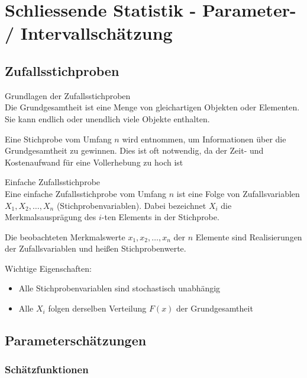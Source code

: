

\section{Schliessende Statistik - Parameter- / Intervallschätzung}

\subsection{Zufallsstichproben}

\begin{concept}{Grundlagen der Zufallsstichproben}\\
Die Grundgesamtheit ist eine Menge von gleichartigen Objekten oder Elementen. Sie kann endlich oder unendlich viele Objekte enthalten.

Eine Stichprobe vom Umfang $n$ wird entnommen, um Informationen über die Grundgesamtheit zu gewinnen. Dies ist oft notwendig, da der Zeit- und Kostenaufwand für eine Vollerhebung zu hoch ist
\end{concept}

\begin{definition}{Einfache Zufallsstichprobe}\\
Eine einfache Zufallsstichprobe vom Umfang $n$ ist eine Folge von Zufallsvariablen $X_1, X_2, \ldots, X_n$ (Stichprobenvariablen). Dabei bezeichnet $X_i$ die Merkmalsausprägung des $i$-ten Elements in der Stichprobe.

Die beobachteten Merkmalswerte $x_1, x_2, \ldots, x_n$ der $n$ Elemente sind Realisierungen der Zufallsvariablen und heißen Stichprobenwerte.

Wichtige Eigenschaften:
\begin{itemize}
  \item Alle Stichprobenvariablen sind stochastisch unabhängig
  \item Alle $X_i$ folgen derselben Verteilung $F(x)$ der Grundgesamtheit
\end{itemize}
\end{definition}

\subsection{Parameterschätzungen}

\subsubsection{Schätzfunktionen}

